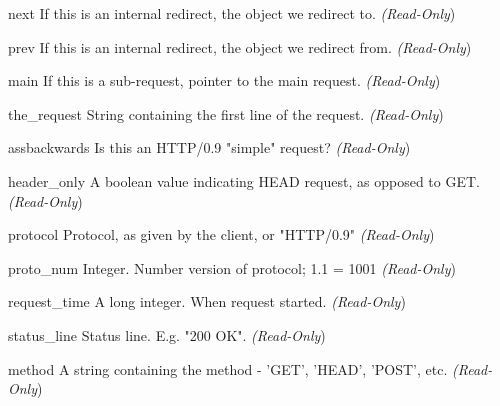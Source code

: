 \begin{memberdesc}[Request]{next}
If this is an internal redirect, the  object we redirect to. 
\emph{(Read-Only})
\end{memberdesc}

\begin{memberdesc}[Request]{prev}
If this is an internal redirect, the  object we redirect from.
\emph{(Read-Only})
\end{memberdesc}

\begin{memberdesc}[Request]{main}
If this is a sub-request, pointer to the main request. 
\emph{(Read-Only})
\end{memberdesc}

\begin{memberdesc}[Request]{the_request}
String containing the first line of the request.
\emph{(Read-Only})
\end{memberdesc}

\begin{memberdesc}[Request]{assbackwards}
Is this an HTTP/0.9 "simple" request? 
\emph{(Read-Only})
\end{memberdesc}

\begin{memberdesc}[Request]{header_only}
A boolean value indicating HEAD request, as opposed to GET. 
\emph{(Read-Only})
\end{memberdesc}

\begin{memberdesc}[Request]{protocol}
Protocol, as given by the client, or "HTTP/0.9"
\emph{(Read-Only})
\end{memberdesc}

\begin{memberdesc}[Request]{proto_num}
Integer. Number version of protocol; 1.1 = 1001 
\emph{(Read-Only})
\end{memberdesc}

\begin{memberdesc}[Request]{request_time}
A long integer. When request started.
\emph{(Read-Only})
\end{memberdesc}

\begin{memberdesc}[Request]{status_line}
Status line. E.g. "200 OK". 
\emph{(Read-Only})
\end{memberdesc}

\begin{memberdesc}[Request]{method}
A string containing the method - 'GET', 'HEAD', 'POST', etc.
\emph{(Read-Only})
\end{memberdesc}

